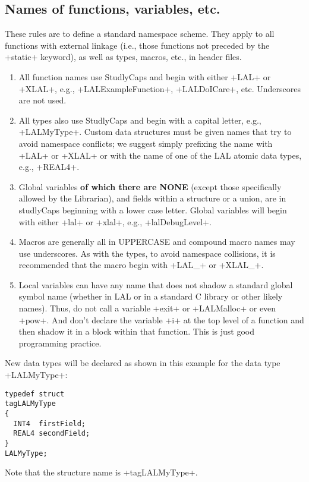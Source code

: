\documentclass[10pt]{ligodcc}
\makeatletter
\def\verb{\relax\ifmmode\hbox\else\leavevmode\null\fi
  \bgroup
    \color{blue}\small
    \verb@eol@error \let\do\@makeother \dospecials
    \verbatim@font\@noligs
    \@ifstar\@sverb\@verb}
\makeatother
\begin{document}
\subsection{Names of functions, variables, etc.}

These rules are to define a standard namespace scheme.  They apply to all
functions with external linkage (i.e., those functions not preceded by the
\verb+static+ keyword), as well as types, macros, etc., in header files.

\begin{enumerate}
\item All function names use StudlyCaps and begin with either \verb+LAL+
or \verb+XLAL+, e.g., \verb+LALExampleFunction+, \verb+LALDoICare+, etc.
Underscores are not used.
\item All types also use StudlyCaps and begin with a capital letter,
e.g., \verb+LALMyType+.  Custom data structures must be given names that try
to avoid namespace conflicts; we suggest simply prefixing the name with
\verb+LAL+ or \verb+XLAL+ or with the name of one of the LAL atomic data
types, e.g., \verb+REAL4+.
\item Global variables \textbf{of which there are NONE} (except those
specifically allowed by the Librarian), and fields within a structure or
a union, are in studlyCaps beginning with a lower case letter.  Global
variables will begin with either \verb+lal+ or \verb+xlal+, e.g.,
\verb+lalDebugLevel+.
\item Macros are generally all in UPPERCASE and compound macro names may
use underscores.  As with the types, to avoid namespace collisions, it is
recommended that the macro begin with \verb+LAL_+ or  \verb+XLAL_+.
\item Local variables can have any name that does not shadow a standard
global symbol name (whether in LAL or in a standard C library or other likely
names).  Thus, do not call a variable \verb+exit+ or \verb+LALMalloc+ or
even \verb+pow+.  And don't declare the variable \verb+i+ at the top level
of a function and then shadow it in a block within that function.  This is
just good programming practice.
\end{enumerate}

New data types will be declared as shown in this example for the data type
\verb+LALMyType+:
\begin{verbatim}
typedef struct
tagLALMyType
{
  INT4  firstField;
  REAL4 secondField;
}
LALMyType;
\end{verbatim}
Note that the structure name is \verb+tagLALMyType+.
\end{document}
